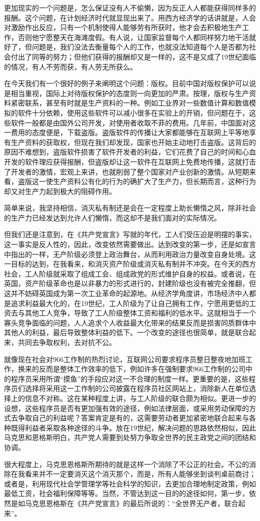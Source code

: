 \documentclass[a4paper,11pt]{ctexart}
\begin{document}
更加现实的一个问题是，怎么保证没有人不偷懒，因为反正人人都能获得同样多的报酬。这个问题，在计划经济时代就显现出来了。用西方经济学的话讲就是，人会对激励作出反应，只有一个机制使得人能够劳有所获时，他才会去积极地生产工作，否则他宁愿整天在海滩度假。有人说，让国家监督每个人都同样努力地干活就好了，但问题是，我们没法去衡量每个人的工作，也就没法知道每个人是否都为社会付出了同等的努力；但他们获得的报酬却又是一样的，这不是又成了19世纪面临的情况，有人不劳而获，有人劳无所获么。\par
在今天我们有一个很好的例子来阐明这个问题：版权。目前中国对版权保护可以说是相当重视，国际上对待版权保护的态度则一向更加的严肃。按理，版权与生产资料紧密联系，甚至有时就是生产资料的一种。例如工业界对一些数值计算和数值模拟的软件十分依赖，使用这些软件可以减小很多在实验上的开销，但问题在于，这些软件一般都是由国外公司开发，对使用者收取不菲的费用。几年前，中国面对这一费用的态度便是，下载盗版。盗版软件的传播让大家都能够在互联网上平等地享有生产资料的获取权，但现在我们却发现，国家也开始主动地打击盗版。这背后的原因不难想到，盗版软件损害了软件开发者的利益，它们花费了自己的时间和心血开发的软件理应获得报酬，但盗版却让这一软件在互联网上免费地传播，这就打击了开发者的激情，宏观上来讲，也就削弱了整个国家对产业创新的激情。从短期来看，盗版这一使生产资料公有化的行为的确扩大了生产力，但长期而言，这种行为却又对生产力起到极大的阻碍作用。\par
简单来说，我坚持相信，消灭私有制还是会在一定程度上助长懒惰之风，除非社会的生产力已经发达到允许人们懒惰，而这却不是我们面对的实际情况。\par
但我们还是注意到，在《共产党宣言》写就的年代，工人们受压迫是明摆的事实，这一事实是反人性的，因此，改变依然需要做出。达到改变的第一步，还是如宣言中指出的一样，无产阶级必须登上政治舞台，从而利用政治力量改变自身处境。这一目标的达到，在我看来，和消灭资产阶级或消灭私有制并不冲突。在今天的西方社会，工人阶级就采取了组成工会、组成政党的形式维护自身的权益。或者说，在英国，资产阶级革命也是以非暴力的形式进行的，封建阶级也没有被完全推翻，但这并不妨碍英国成为第一次工业革命的起源地。从经济学角度讲，市场经济中人都是追求利益最大化的，在19世纪，工人阶级为了让自己拥有工作，宁愿用更低的工资去与其他工人竞争，导致了工人阶级整体工资和福利的低水平。这就相当于一个寡头竞争面临的问题，人人追求个人收益最大化带来的结果反而是损害同质群体中其他人的利益，最后导致整体利益的低下。一个改变的途径也很简单，就是联合起来，共同去争取权利，去对抗不公。\par
就像现在社会对966工作制的热烈讨论，互联网公司要求程序员整日整夜地加班工作，换来的反而是整体工作效率的低下，例如许多在强制要求966工作制的公司中的程序员采用所谓“摸鱼”的手段应对这一不合理的制度一样。更重要的是，这些程序员们选择将采用这一工作制的公司披露在程序员社区网站上，消除新人在单位选择上的信息不对称。这在某种程度上讲，与工人阶级的联合颇为相似。更进一步的设想，这些程序员是否有更加强有效的途径，例如法律层面，或采用劳动保障的方式去争取自己的利益呢？答案肯定是有的，这需要劳动者更加紧密地联合起来与各种既得利益者采取各种途径的斗争。放在19世纪，解决问题的思路依然相似，因此马克思和恩格斯明白，共产党人需要到处努力争取全世界的民主政党之间的团结和协调。\par
很大程度上，马克思恩格斯所期待的就是这样一个消除了不公正的社会。不公的消除在我看来并不一定要消灭这个消灭那个，而是，所有人能够坐到谈判桌前商讨；或者是，利用现代社会学管理学等社会科学的知识，去更加合理地制定政策，例如最低工资，社会福利保障等等。当然，不管达到这一目的的途径如何，第一步，依然是如马克思恩格斯在《共产党宣言》的最后所说的：“全世界无产者，联合起来”。
\end{document}
